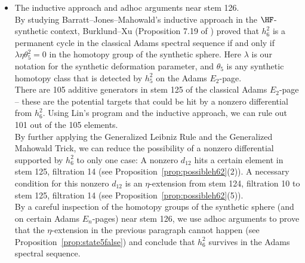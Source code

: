\begin{itemize}
    \noindent With the Generalized Leibniz Rule and the Generalized Mahowald Trick, Lin’s program becomes even more powerful, enabling the derivation of additional differentials. The program rigorously verifies the conditions of the relevant theorems and generates human-readable proofs \cite{LWXZenodo} for all differentials computed by the machine. In the Appendix, readers will find tables of Adams differentials that are used in the proof of the main Theorem \ref{thm:h62}.\\

    \item The inductive approach and adhoc arguments near stem 126.\\

    \noindent By studying Barratt--Jones--Mahowald's inductive approach \cite{BJMinduction} in the $\HF$-synthetic context, Burklund--Xu (Proposition 7.19 of \cite{BurklundXu}) proved that $h_6^2$ is a permanent cycle in the classical Adams spectral sequence if and only if $\lambda \eta \theta_5^2 = 0$ in the homotopy group of the synthetic sphere. Here $\lambda$ is our notation for the synthetic deformation parameter, and $\theta_5$ is any synthetic homotopy class that is detected by $h_5^2$ on the Adams $E_2$-page.   \\

    \noindent There are 105 additive generators in stem 125 of the classical Adams $E_2$-page -- these are the potential targets that could be hit by a nonzero differential from $h_6^2$. Using Lin's program and the inductive approach, we can rule out 101 out of the 105 elements.\\
    
    \noindent By further applying the Generalized Leibniz Rule and the Generalized Mahowald Trick, we can reduce the possibility of a nonzero differential supported by $h_6^2$ to only one case: A nonzero $d_{12}$ hits a certain element in stem 125, filtration 14 (see Proposition~\ref{prop:possibleh62}(2)). A necessary condition for this nonzero $d_{12}$ is an $\eta$-extension from stem 124, filtration 10 to stem 125, filtration 14 (see Proposition~\ref{prop:possibleh62}(5)). \\
    
    \noindent By a careful inspection of the homotopy groups of the synthetic sphere (and on certain Adams $E_n$-pages) near stem 126, we use adhoc arguments to prove that the $\eta$-extension in the previous paragraph cannot happen (see Proposition~\ref{prop:state5false}) and conclude that $h_6^2$ survives in the Adams spectral sequence. \\
\end{itemize} 

